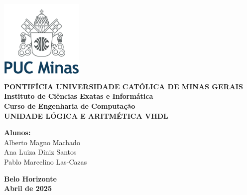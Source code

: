     
\begin{titlepage}
    \centering

    \includegraphics[width=4cm]{images/logo_pucminas.png}\\[1cm]

    {\large\textbf{PONTIFÍCIA UNIVERSIDADE CATÓLICA DE MINAS GERAIS}}\\[0.3cm]
    {\large\textbf{Instituto de Ciências Exatas e Informática}}\\[0.3cm]
    {\large\textbf{Curso de Engenharia de Computação}}\\[5cm]

    {\Large\bfseries UNIDADE LÓGICA E ARITMÉTICA VHDL}\\[5cm]

    \begin{flushright}
        \textbf{Alunos:}\\
        Alberto Magno Machado\\
        Ana Luiza Diniz Santos\\
        Pablo Marcelino Las-Cazas
    \end{flushright}

    \vfill

    \textbf{Belo Horizonte}\\
    \textbf{Abril de 2025}
\end{titlepage}

